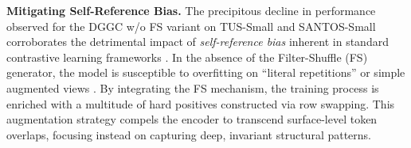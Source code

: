 \noindent\textbf{Mitigating Self-Reference Bias.} The precipitous decline in performance observed for the DGGC w/o FS variant on TUS-Small and SANTOS-Small corroborates the detrimental impact of \textit{self-reference bias} inherent in standard contrastive learning frameworks \cite{robinson2021contrastive}. In the absence of the Filter-Shuffle (FS) generator, the model is susceptible to overfitting on ``literal repetitions'' or simple augmented views \cite{chen2020simple}. By integrating the FS mechanism, the training process is enriched with a multitude of hard positives constructed via row swapping. This augmentation strategy compels the encoder to transcend surface-level token overlaps, focusing instead on capturing deep, invariant structural patterns.

